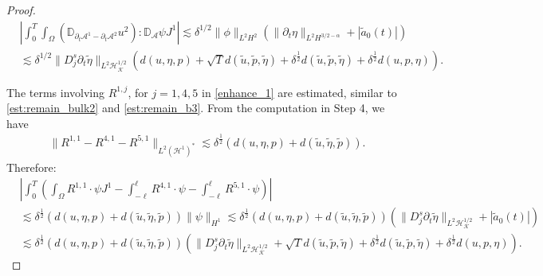 \documentclass[letterpaper,reqno,10pt,twoside]{amsart}
\theoremstyle{definition}
\theoremstyle{remark}
\def\p{\partial}
\def\Om{\Omega}
\begin{document}
\begin{proof}
			\begin{equation}
				\begin{aligned}
					&|\int_0^T\int_\Om\left( \mathbb{D}_{\p_t\mathcal{A}^1-\p_t\mathcal{A}^2}{u}^2\right):\mathbb{D}_{\mathcal{A}}\psi J^1|\lesssim \delta^{1/2}\|\phi\|_{L^2H^2}(\|\p_t\eta\|_{L^2H^{3/2-\alpha}}+|\tilde{a}_{0}(t)|)\\
					&\lesssim\delta^{1/2}\|D_j^s\p_t\tilde{\eta}\|_{L^2\mathcal{H}_{\mathcal{K}}^{1/2}}(d(u,\eta,p)+\sqrt{T}d(\tilde{u},\tilde{p},\tilde{\eta})+\delta^{\frac{1}{2}} d(\tilde{u},\tilde{p},\tilde{\eta})+\delta^{\frac{1}{2}} d({u},{p},{\eta})).
				\end{aligned}
			\end{equation}
			
			The terms involving $R^{1, j}$, for $j=1, 4,5$ in \eqref{enhance_1} are estimated, similar to \eqref{est:remain_bulk2} and \eqref{est:remain_b3}.  From the computation in Step 4, we have
			\begin{align}
				\|R^{1,1}-R^{4,1}-R^{5,1}\|_{L^{2}(\mathcal{H}^1)^{*}}\lesssim \delta^{\frac{1}{2}}(d(u,\eta,p)+d(\tilde u,\tilde\eta,\tilde p)).
			\end{align}
			\noindent Therefore:
			\begin{equation}\label{est:r11_r14}
				\begin{aligned}
					&|\int_0^T(\int_{\Om}R^{1,1}\cdot \psi J^1-\int_{-\ell}^{\ell}R^{4,1}\cdot \psi-\int_{-\ell}^{\ell}R^{5,1}\cdot \psi)|\\
					&\lesssim \delta^{\frac{1}{2}}(d(u,\eta,p)+d(\tilde u,\tilde\eta,\tilde p))\|\psi\|_{H^{1}}\lesssim \delta^{\frac{1}{2}}(d(u,\eta,p)+d(\tilde u,\tilde\eta,\tilde p))(\|D_j^s\p_t\tilde{\eta}\|_{L^2\mathcal{H}_{\mathcal{K}}^{1/2}}+|\tilde{a}_{0}(t)|)\\
					&\lesssim \delta^{\frac{1}{2}}(d(u,\eta,p)+d(\tilde u,\tilde\eta,\tilde p))(\|D_j^s\p_t\tilde{\eta}\|_{L^2\mathcal{H}_{\mathcal{K}}^{1/2}}+\sqrt{T}d(\tilde{u},\tilde{p},\tilde{\eta})+\delta^{\frac{1}{2}} d(\tilde{u},\tilde{p},\tilde{\eta})+\delta^{\frac{1}{2}} d({u},{p},{\eta})).
				\end{aligned}
			\end{equation}
			

\end{proof}
\end{document}
